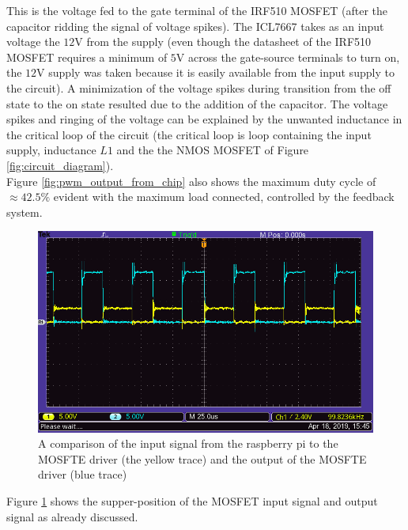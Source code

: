 \documentclass[a4paper, 12pt]{article}
\begin{document}
This is the voltage fed to the gate terminal of the IRF510 MOSFET (after the capacitor ridding the signal of voltage spikes). The ICL7667 takes as an input voltage the $12$V from the supply (even though the datasheet of the IRF510 MOSFET requires a minimum of $5$V across the gate-source terminals to turn on, the $12$V supply was taken because it is easily available from the input supply to the circuit). A minimization of the voltage spikes during transition from the off state to the on state resulted due to the addition of the capacitor. The voltage spikes and ringing of the voltage can be explained by the unwanted inductance in the critical loop of the circuit (the critical loop is loop containing the input supply, inductance $L1$ and the the NMOS MOSFET of Figure \ref{fig:circuit_diagram}). \\

Figure \ref{fig:pwm_output_from_chip} also shows the maximum duty cycle of $\approx 42.5\%$ evident with the maximum load connected, controlled by the feedback system.\\

\begin{figure}[H]
  \centering
  \includegraphics[width=\textwidth]{images/pwm_input_output_comparison.png}
  \caption{A comparison of the input signal from the raspberry pi to the MOSFTE driver (the yellow trace) and the output of the MOSFTE driver (blue trace)}
  \label{fig:pwm_input_output_comparison}
\end{figure}

Figure \ref{fig:pwm_input_output_comparison} shows the supper-position of the MOSFET input signal and output signal as already discussed.\\
\end{document}
